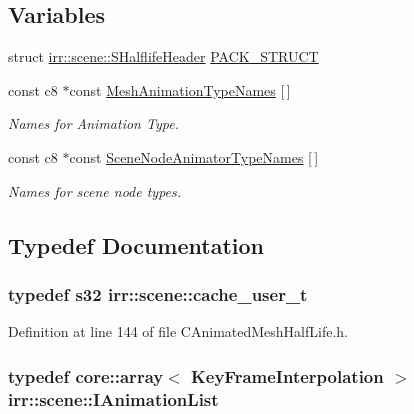 \subsection*{Variables}
\begin{DoxyCompactItemize}
\item 
struct \hyperlink{structirr_1_1scene_1_1_s_halflife_header}{irr\-::scene\-::\-S\-Halflife\-Header} \hyperlink{namespaceirr_1_1scene_afee0766eb2e638daf8735faf12ee786d}{P\-A\-C\-K\-\_\-\-S\-T\-R\-U\-C\-T}
\item 
const c8 $\ast$const \hyperlink{namespaceirr_1_1scene_a3b848c92b179417c979c6d695fba9e93}{Mesh\-Animation\-Type\-Names} \mbox{[}$\,$\mbox{]}
\begin{DoxyCompactList}\small\item\em Names for Animation Type. \end{DoxyCompactList}\item 
const c8 $\ast$const \hyperlink{namespaceirr_1_1scene_ad9c721d63e1ed3fe2e3661eb419de5eb}{Scene\-Node\-Animator\-Type\-Names} \mbox{[}$\,$\mbox{]}
\begin{DoxyCompactList}\small\item\em Names for scene node types. \end{DoxyCompactList}\end{DoxyCompactItemize}


\subsection{Typedef Documentation}
\hypertarget{namespaceirr_1_1scene_ac6a6f93a71f58df385c659d6cd36b930}{
\subsubsection[{cache\-\_\-user\-\_\-t}]{\setlength{\rightskip}{0pt plus 5cm}typedef s32 {\bf irr\-::scene\-::cache\-\_\-user\-\_\-t}}}\label{namespaceirr_1_1scene_ac6a6f93a71f58df385c659d6cd36b930}


Definition at line 144 of file C\-Animated\-Mesh\-Half\-Life.\-h.

\hypertarget{namespaceirr_1_1scene_a88c0ab57991ea513ec59370ffe857645}{
\subsubsection[{I\-Animation\-List}]{\setlength{\rightskip}{0pt plus 5cm}typedef core\-::array$<$ {\bf Key\-Frame\-Interpolation} $>$ {\bf irr\-::scene\-::\-I\-Animation\-List}}}\label{namespaceirr_1_1scene_a88c0ab57991ea513ec59370ffe857645}


